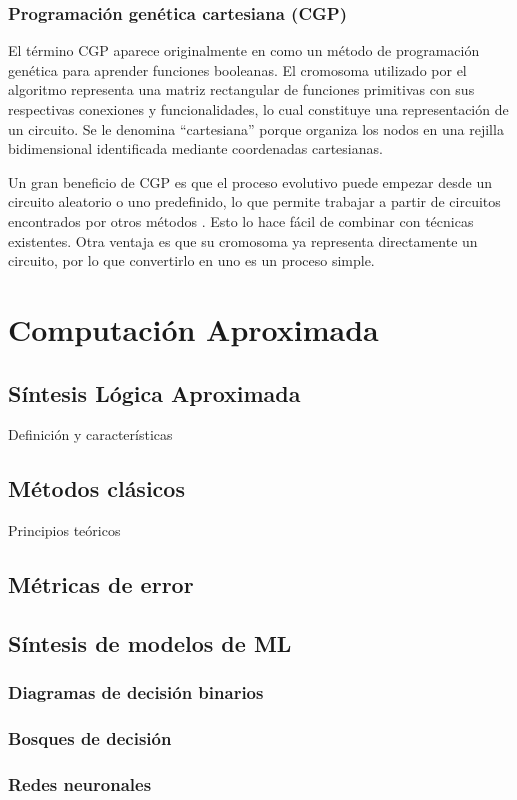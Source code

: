 \subsubsection{Programación genética cartesiana (CGP)}

El término CGP aparece originalmente en \cite{miller_empirical_1999} como un
método de programación genética para aprender funciones booleanas. El cromosoma
utilizado por el algoritmo representa una matriz rectangular de funciones
primitivas con sus respectivas conexiones y funcionalidades, lo cual constituye
una representación de un circuito. Se le denomina ``cartesiana'' porque
organiza los nodos en una rejilla bidimensional identificada mediante
coordenadas cartesianas.

Un gran beneficio de CGP es que el proceso evolutivo puede empezar desde un
circuito aleatorio o uno predefinido, lo que permite trabajar a partir de
circuitos encontrados por otros métodos \cite{berndt_cgp-based_2022}. Esto lo
hace fácil de combinar con técnicas existentes. Otra ventaja es que su
cromosoma ya representa directamente un circuito, por lo que convertirlo en uno
es un proceso simple.

\section{Computación Aproximada}

\subsection{Síntesis Lógica Aproximada}

Definición y características

\subsection{Métodos clásicos}

Principios teóricos

\subsection{Métricas de error}

\subsection{Síntesis de modelos de ML}

\subsubsection{Diagramas de decisión binarios}

\subsubsection{Bosques de decisión}

\subsubsection{Redes neuronales}
